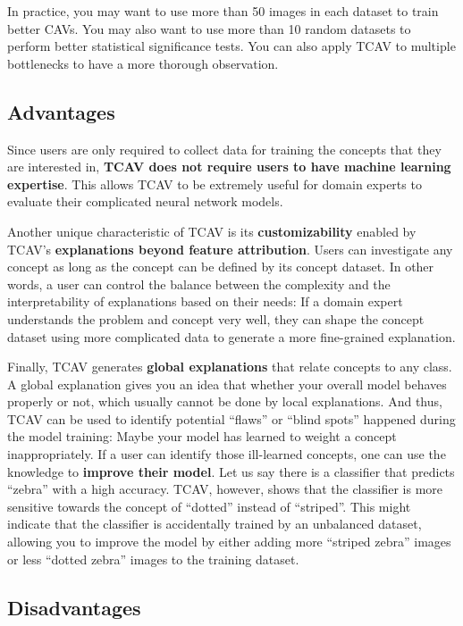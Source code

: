 \documentclass[12pt,]{krantz}
\begin{document}
In practice, you may want to use more than 50 images in each dataset to
train better CAVs. You may also want to use more than 10 random datasets
to perform better statistical significance tests. You can also apply
TCAV to multiple bottlenecks to have a more thorough observation.

\subsection{Advantages}\label{advantages-20}

Since users are only required to collect data for training the concepts
that they are interested in, \textbf{TCAV does not require users to have
machine learning expertise}. This allows TCAV to be extremely useful for
domain experts to evaluate their complicated neural network models.

Another unique characteristic of TCAV is its \textbf{customizability}
enabled by TCAV's \textbf{explanations beyond feature attribution}.
Users can investigate any concept as long as the concept can be defined
by its concept dataset. In other words, a user can control the balance
between the complexity and the interpretability of explanations based on
their needs: If a domain expert understands the problem and concept very
well, they can shape the concept dataset using more complicated data to
generate a more fine-grained explanation.

Finally, TCAV generates \textbf{global explanations} that relate
concepts to any class. A global explanation gives you an idea that
whether your overall model behaves properly or not, which usually cannot
be done by local explanations. And thus, TCAV can be used to identify
potential ``flaws'' or ``blind spots'' happened during the model
training: Maybe your model has learned to weight a concept
inappropriately. If a user can identify those ill-learned concepts, one
can use the knowledge to \textbf{improve their model}. Let us say there
is a classifier that predicts ``zebra'' with a high accuracy. TCAV,
however, shows that the classifier is more sensitive towards the concept
of ``dotted'' instead of ``striped''. This might indicate that the
classifier is accidentally trained by an unbalanced dataset, allowing
you to improve the model by either adding more ``striped zebra'' images
or less ``dotted zebra'' images to the training dataset.

\subsection{Disadvantages}\label{disadvantages-20}
\end{document}
